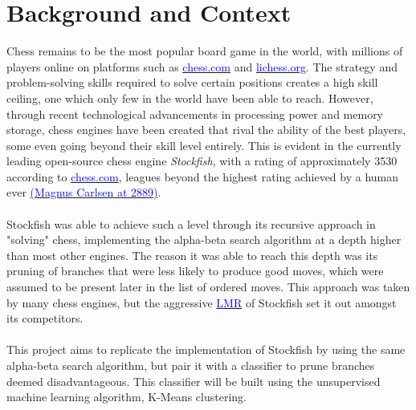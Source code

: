 \chapter{Background and Context}


Chess remains to be the most popular board game in the world, with millions of players online on platforms such as \href{https://www.chess.com/}{\textcolor{blue}{chess.com}} and \href{https://lichess.org/}{\textcolor{blue}{lichess.org}}. The strategy and problem-solving skills required to solve certain positions creates a high skill ceiling, one which only few in the world have been able to reach. However, through recent technological advancements in processing power and memory storage, chess engines have been created that rival the ability of the best players, some even going beyond their skill level entirely. This is evident in the currently leading open-source chess engine \emph{Stockfish}, with a rating of approximately 3530 according to \href{https://www.chess.com/terms/stockfish-chess-engine}{\textcolor{blue}{chess.com}}, leagues beyond the highest rating achieved by a human ever \href{https://www.chess.com/article/view/best-chess-players-of-all-time#magnus}{\textcolor{blue}{(Magnus Carlsen at 2889)}}. \\
\\
Stockfish was able to achieve such a level through its recursive approach in "solving" chess, implementing the alpha-beta search algorithm at a depth higher than most other engines. The reason it was able to reach this depth was its pruning of branches that were less likely to produce good moves, which were assumed to be present later in the list of ordered moves. This approach was taken by many chess engines, but the aggressive \href{https://www.chessprogramming.org/Late_Move_Reductions}{\textcolor{blue}{LMR}} of Stockfish set it out amongst its competitors. \\
\\
This project aims to replicate the implementation of Stockfish by using the same alpha-beta search algorithm, but pair it with a classifier to prune branches deemed disadvantageous. This classifier will be built using the unsupervised machine learning algorithm, K-Means clustering.